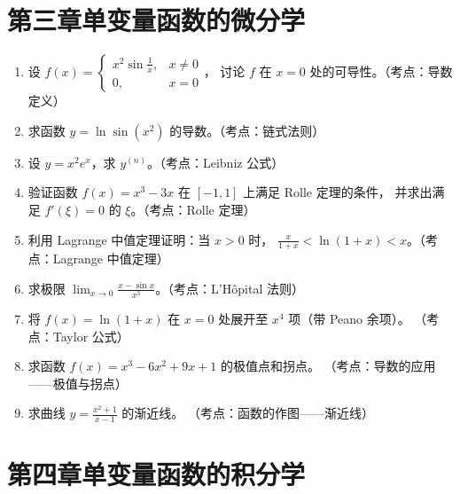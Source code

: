 \documentclass[12pt,a4paper]{ctexart}
\begin{document}
\section*{第三章\quad 单变量函数的微分学}

\begin{enumerate}[leftmargin=*,label=\arabic*.,start=11]
  \item 设 $f(x) = \begin{cases} x^2\sin\frac{1}{x}, & x \neq 0 \\ 0, & x = 0 \end{cases}$，
    讨论 $f$ 在 $x=0$ 处的可导性。（考点：导数定义）

  \item 求函数 $y = \ln\sin(x^2)$ 的导数。（考点：链式法则）

  \item 设 $y = x^2 e^x$，求 $y^{(n)}$。（考点：Leibniz 公式）

  \item 验证函数 $f(x) = x^3 - 3x$ 在 $[-1,1]$ 上满足 Rolle 定理的条件，
    并求出满足 $f'(\xi)=0$ 的 $\xi$。（考点：Rolle 定理）

  \item 利用 Lagrange 中值定理证明：当 $x > 0$ 时，
    $\frac{x}{1+x} < \ln(1+x) < x$。（考点：Lagrange 中值定理）

  \item 求极限 $\displaystyle\lim_{x\to 0}\frac{x-\sin x}{x^3}$。（考点：L'H\^opital 法则）

  \item 将 $f(x) = \ln(1+x)$ 在 $x=0$ 处展开至 $x^4$ 项（带 Peano 余项）。
    （考点：Taylor 公式）

  \item 求函数 $f(x) = x^3 - 6x^2 + 9x + 1$ 的极值点和拐点。
    （考点：导数的应用——极值与拐点）

  \item 求曲线 $y = \frac{x^2+1}{x-1}$ 的渐近线。
    （考点：函数的作图——渐近线）
\end{enumerate}

\section*{第四章\quad 单变量函数的积分学}
\end{document}
